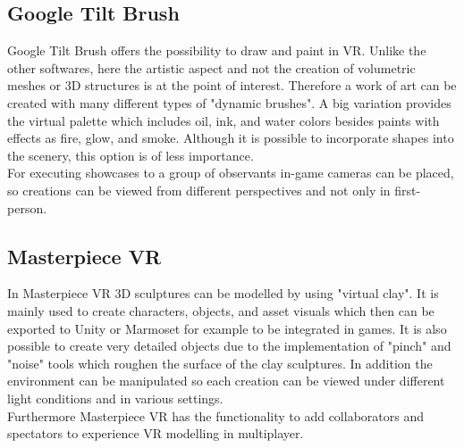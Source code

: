 \documentclass{report}
\begin{document}
		\subsection[Google Tilt Brush]{Google Tilt Brush \textsc{\small{\cite{GTB}}}}
		\startsubsection
			Google Tilt Brush offers the possibility to draw and paint in VR. Unlike the other softwares, here the artistic aspect and not the creation of volumetric meshes or 3D structures is at the point of interest. Therefore a work of art can be created with many different types of "dynamic brushes". A big variation provides the virtual palette which includes oil, ink, and water colors besides paints with effects as fire, glow, and smoke. Although it is possible to incorporate shapes into the scenery, this option is of less importance. \\
			For executing showcases to a group of observants in-game cameras can be placed, so creations can be viewed from different perspectives and not only in first-person.
		\closesection
		\subsection[Masterpiece VR]{Masterpiece VR \textsc{\small{\cite{MVR}}}}
		\startsubsection
			In Masterpiece VR 3D  sculptures can be modelled by using "virtual clay". It is mainly used to create characters, objects, and asset visuals which then can be exported to Unity or Marmoset for example to be integrated in games. It is also possible to create very detailed objects due to the implementation of "pinch" and "noise" tools which roughen the surface of the clay sculptures. In addition the environment can be manipulated so each creation can be viewed under different light conditions and in various settings. \\
			Furthermore Masterpiece VR has the functionality to add collaborators and spectators to experience VR modelling in multiplayer.
		\closesection
\end{document}
